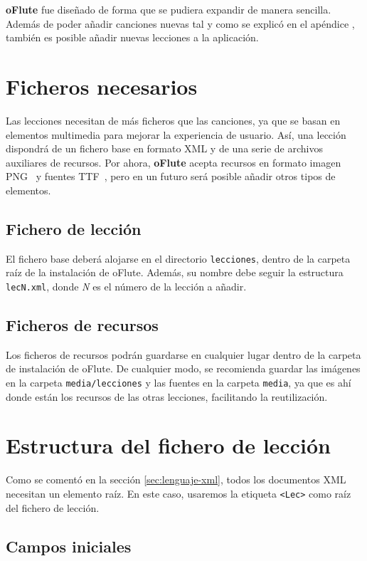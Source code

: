 \textbf{oFlute} fue diseñado de forma que se pudiera expandir de manera
sencilla. Además de poder añadir canciones nuevas tal y como se explicó en el
apéndice \textit{}, también es posible añadir
nuevas lecciones a la aplicación.

\section{Ficheros necesarios}

Las lecciones necesitan de más ficheros que las canciones, ya que se basan en
elementos multimedia para mejorar la experiencia de usuario. Así, una lección
dispondrá de un fichero base en formato XML y de una serie de archivos
auxiliares de recursos. Por ahora, \textbf{oFlute} acepta recursos en formato
imagen PNG~\cite{refpng} y fuentes TTF~\cite{reftruetypefile}, pero en un futuro
será posible añadir otros tipos de elementos.

\subsection{Fichero de lección}
El fichero base deberá alojarse en el directorio \texttt{lecciones}, dentro de
la carpeta raíz de la instalación de oFlute. Además, su nombre debe seguir la
estructura \texttt{lecN.xml}, donde \textit{N} es el número de la lección a
añadir.

\subsection{Ficheros de recursos}
Los ficheros de recursos podrán guardarse en cualquier lugar dentro de la
carpeta de instalación de oFlute. De cualquier modo, se recomienda guardar las
imágenes en la carpeta \texttt{media/lecciones} y las fuentes en la carpeta
\texttt{media}, ya que es ahí donde están los recursos de las otras lecciones,
facilitando la reutilización.

\section{Estructura del fichero de lección}

Como se comentó en la sección \ref{sec:lenguaje-xml}, todos los documentos XML
necesitan un elemento raíz. En este caso, usaremos la etiqueta \texttt{<Lec>}
como raíz del fichero de lección.


\subsection{Campos iniciales}

